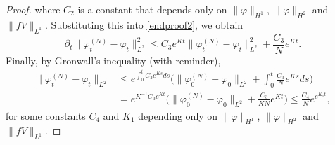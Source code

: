 \documentclass[11pt,a4paper,DIV11]{scrartcl}	%
\begin{document}
\begin{proof}
  where $C_2$ is a constant that depends only on $\| \varphi \|_{H^1}$, $\|
  \varphi \|_{H^2}$ and $\| fV \|_{L^1}$. Substituting this into
  \eqref{endproof2}, we obtain
  \[
    \partial_t \| \varphi_t^{(N)} - \varphi_t \|_{L^2}^2 \le C_3 e^{Kt} \|
    \varphi_t^{(N)} - \varphi_t \|_{L^2}^2 + \frac{C_3}{N} e^{Kt}.
  \]
  Finally, by Gronwall's inequality (with reminder),
  \begin{align*}
    \| \varphi_t^{(N)} - \varphi_t \|_{L^2} & \le e^{\int_0^t C_3 e^{Ks} ds}
    \Big( \| \varphi_0^{(N)} - \varphi_0 \|_{L^2} + \int_0^t \frac{C_3}{N}
    e^{Ks} ds \big) \\
    & = e^{K^{-1} C_3 e^{Kt}} \Big( \| \varphi_0^{(N)} - \varphi_0 \|_{L^2}
    + \frac{C_3}{KN} e^{Kt} \Big) \le \frac{C_4}{N} e^{e^{K_1 t}},
  \end{align*}
  for some constants $C_4$ and $K_1$ depending only on $\| \varphi
  \|_{H^1}$, $\| \varphi \|_{H^2}$ and $\| fV \|_{L^1}$.
\end{proof}
\end{document}
